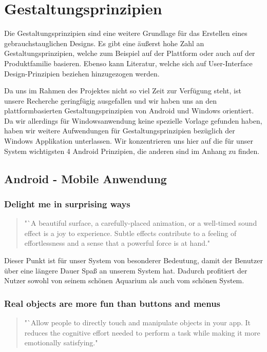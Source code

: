 \chapter{Gestaltungsprinzipien}
Die Gestaltungsprinzipien sind eine weitere Grundlage für das Erstellen eines gebrauchstauglichen Designs. Es gibt eine äußerst hohe Zahl an Gestaltungsprinzipien, welche zum Beispiel auf der Plattform oder auch auf der Produktfamilie basieren. Ebenso kann Literatur, welche sich auf User-Interface Design-Prinzipien beziehen hinzugezogen werden. 

Da uns im Rahmen des Projektes nicht so viel Zeit zur Verfügung steht, ist unsere Recherche geringfügig ausgefallen und wir haben uns an den plattformbasierten Gestaltungsprinzipien von Android \cite{android:design} und Windows orientiert. Da wir allerdings für Windowsanwendung keine spezielle Vorlage gefunden haben, haben wir weitere Aufwendungen für Gestaltungsprinzipien bezüglich der Windows Applikation unterlassen. Wir konzentrieren uns hier auf die für unser System wichtigsten 4 Android Prinzipien, die anderen sind im Anhang zu finden.

\section{Android - Mobile Anwendung}

\subsection{Delight me in surprising ways}\label{rule:1}
\begin{quote} "`A beautiful surface, a carefully-placed animation, or a well-timed sound effect is a joy to experience. Subtle effects contribute to a feeling of effortlessness and a sense that a powerful force is at hand."
\end{quote}

Dieser Punkt ist für unser System von besonderer Bedeutung, damit der Benutzer über eine längere Dauer Spaß an unserem System hat. Dadurch profitiert der Nutzer sowohl von seinem schönen Aquarium als auch vom schönen System.
 
\subsection{Real objects are more fun than buttons and menus}\label{rule:2}
\begin{quote} "`Allow people to directly touch and manipulate objects in your app. It reduces the cognitive effort needed to perform a task while making it more emotionally satisfying."\end{quote}

